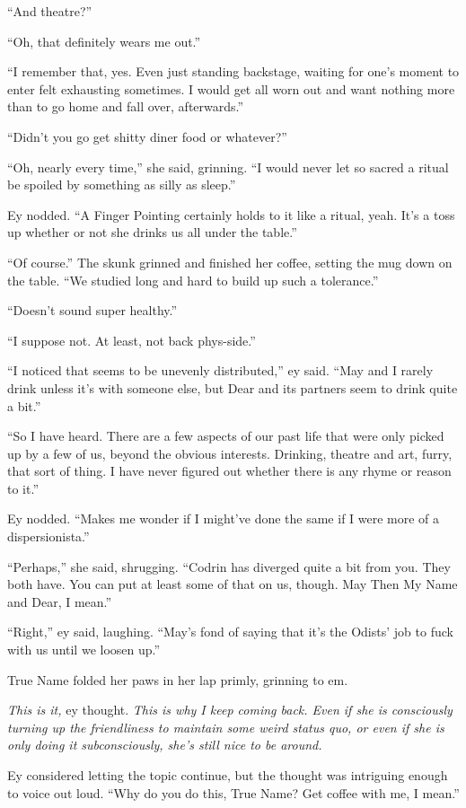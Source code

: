 ``And theatre?''

``Oh, that definitely wears me out.''

``I remember that, yes. Even just standing backstage, waiting for one's moment to enter felt exhausting sometimes. I would get all worn out and want nothing more than to go home and fall over, afterwards.''

``Didn't you go get shitty diner food or whatever?''

``Oh, nearly every time,'' she said, grinning. ``I would never let so sacred a ritual be spoiled by something as silly as sleep.''

Ey nodded. ``A Finger Pointing certainly holds to it like a ritual, yeah. It's a toss up whether or not she drinks us all under the table.''

``Of course.'' The skunk grinned and finished her coffee, setting the mug down on the table. ``We studied long and hard to build up such a tolerance.''

``Doesn't sound super healthy.''

``I suppose not. At least, not back phys-side.''

``I noticed that seems to be unevenly distributed,'' ey said. ``May and I rarely drink unless it's with someone else, but Dear and its partners seem to drink quite a bit.''

``So I have heard. There are a few aspects of our past life that were only picked up by a few of us, beyond the obvious interests. Drinking, theatre and art, furry, that sort of thing. I have never figured out whether there is any rhyme or reason to it.''

Ey nodded. ``Makes me wonder if I might've done the same if I were more of a dispersionista.''

``Perhaps,'' she said, shrugging. ``Codrin has diverged quite a bit from you. They both have. You can put at least some of that on us, though. May Then My Name and Dear, I mean.''

``Right,'' ey said, laughing. ``May's fond of saying that it's the Odists' job to fuck with us until we loosen up.''

True Name folded her paws in her lap primly, grinning to em.

\emph{This is it,} ey thought. \emph{This is why I keep coming back. Even if she is consciously turning up the friendliness to maintain some weird status quo, or even if she is only doing it subconsciously, she's still nice to be around.}

Ey considered letting the topic continue, but the thought was intriguing enough to voice out loud. ``Why do you do this, True Name? Get coffee with me, I mean.''

